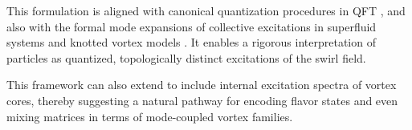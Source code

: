 This formulation is aligned with canonical quantization procedures in QFT \cite{verlinde2021qft}, and also with the formal mode expansions of collective excitations in superfluid systems \cite{pethick2002bose} and knotted vortex models \cite{kleckner2013creation}. It enables a rigorous interpretation of particles as quantized, topologically distinct excitations of the swirl field.

This framework can also extend to include internal excitation spectra of vortex cores, thereby suggesting a natural pathway for encoding flavor states and even mixing matrices in terms of mode-coupled vortex families.

